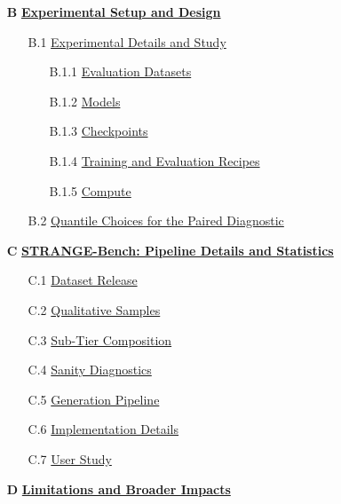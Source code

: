 \begin{itemize}[leftmargin=*,itemsep=8pt,topsep=6pt,parsep=0pt]
  \item[\textbf{B}] \textbf{\hyperref[app:exp-setup]{Experimental Setup and Design}} \dotfill\pageref{app:exp-setup}
    \begin{itemize}[leftmargin=2em,itemsep=2pt,topsep=3pt,parsep=0pt,label={}]
      \item[B.1] \hyperref[app:experimental-details]{Experimental Details and Study} \dotfill\pageref{app:experimental-details}
        \begin{itemize}[leftmargin=2em,itemsep=1pt,topsep=2pt,parsep=0pt,label={}]
          \item[B.1.1] \hyperref[app:exp-datasets]{Evaluation Datasets} \dotfill\pageref{app:exp-datasets}
          \item[B.1.2] \hyperref[app:exp-models]{Models} \dotfill\pageref{app:exp-models}
          \item[B.1.3] \hyperref[app:exp-ckpts]{Checkpoints} \dotfill\pageref{app:exp-ckpts}
          \item[B.1.4] \hyperref[app:exp-recipes]{Training and Evaluation Recipes} \dotfill\pageref{app:exp-recipes}
          \item[B.1.5] \hyperref[app:exp-compute]{Compute} \dotfill\pageref{app:exp-compute}
        \end{itemize}
      \item[B.2] \hyperref[app:splits-impl]{Quantile Choices for the Paired Diagnostic} \dotfill\pageref{app:splits-impl}
    \end{itemize}

  \item[\textbf{C}] \textbf{\hyperref[app:strange-pipeline]{STRANGE-Bench: Pipeline Details and Statistics}} \dotfill\pageref{app:strange-pipeline}
    \begin{itemize}[leftmargin=2em,itemsep=2pt,topsep=3pt,parsep=0pt,label={}]
      \item[C.1] \hyperref[app:strange:release]{Dataset Release} \dotfill\pageref{app:strange:release}
      \item[C.2] \hyperref[app:strange:samples]{Qualitative Samples} \dotfill\pageref{app:strange:samples}
      \item[C.3] \hyperref[app:strange:tiers]{Sub-Tier Composition} \dotfill\pageref{app:strange:tiers}
      \item[C.4] \hyperref[app:strange:diag]{Sanity Diagnostics} \dotfill\pageref{app:strange:diag}
      \item[C.5] \hyperref[app:strange:pipeline]{Generation Pipeline} \dotfill\pageref{app:strange:pipeline}
      \item[C.6] \hyperref[app:strange:impl]{Implementation Details} \dotfill\pageref{app:strange:impl}
      \item[C.7] \hyperref[app:strange:user-study]{User Study} \dotfill\pageref{app:strange:user-study}%
    \end{itemize}

  \item[\textbf{D}] \textbf{\hyperref[app:discussion]{Limitations and Broader Impacts}} \dotfill\pageref{app:discussion}
\end{itemize}


